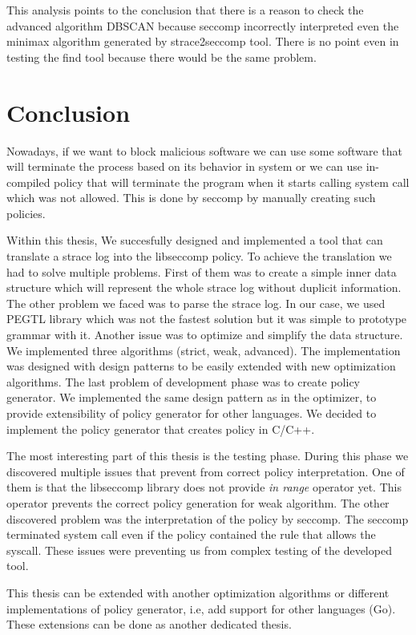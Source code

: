 This analysis points to the conclusion that there is a reason to check the
advanced algorithm DBSCAN because seccomp incorrectly interpreted even the
minimax algorithm generated by strace2seccomp tool. There is no point even in
testing the find tool because there would be the same problem.

\chapter{Conclusion}
Nowadays, if we want to block malicious software we can use some software that
will terminate the process based on its behavior in system or we can use
in-compiled policy that will terminate the program when it starts calling system
call which was not allowed. This is done by seccomp by manually creating such
policies.

Within this thesis, We succesfully designed and implemented a tool that can
translate a strace log into the libseccomp policy. To achieve the translation we
had to solve multiple problems. First of them was to create a simple inner data
structure which will represent the whole strace log without duplicit
information. The other problem we faced was to parse the strace log. In our
case, we used PEGTL library which was not the fastest solution but it was simple
to prototype grammar with it. Another issue was to optimize and simplify the
data structure. We implemented three algorithms (strict, weak, advanced). The
implementation was designed with design patterns to be easily extended with new
optimization algorithms. The last problem of development phase was to create
policy generator. We implemented the same design pattern as in the optimizer, to
provide extensibility of policy generator for other languages. We decided to
implement the policy generator that creates policy in C/C++.

The most interesting part of this thesis is the testing phase. During this phase
we discovered multiple issues that prevent from correct policy interpretation.
One of them is that the libseccomp library does not provide \emph{in range}
operator yet. This operator prevents the correct policy generation for weak
algorithm. The other discovered problem was the interpretation of the policy by
seccomp. The seccomp terminated system call even if the policy contained the
rule that allows the syscall. These issues were preventing us from
complex testing of the developed tool.

This thesis can be extended with another optimization algorithms or different
implementations of policy generator, i.e, add support for other languages (Go).
These extensions can be done as another dedicated thesis.



